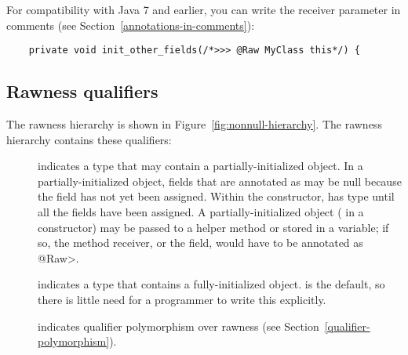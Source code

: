 For compatibility with Java 7 and earlier, you can write the receiver
parameter in comments (see Section~\ref{annotations-in-comments}):
\begin{Verbatim}
    private void init_other_fields(/*>>> @Raw MyClass this*/) {
\end{Verbatim}


\subsection{Rawness qualifiers\label{rawness-qualifiers}}

The rawness hierarchy is shown in Figure~\ref{fig:nonnull-hierarchy}.
The rawness hierarchy contains these qualifiers:

\begin{description}

\item[]
  indicates a type that may contain a partially-initialized object.  In a
  partially-initialized object, fields that are annotated as
   may be null because the field
  has not yet been assigned.  Within the constructor,
   has  type until all
  the  fields have been assigned.
  A partially-initialized object ( in a constructor) may be
  passed to a helper method or stored in a variable; if so, the method
  receiver, or the field, would have to be annotated as \<@Raw>.

\item[]
  indicates a type that contains a fully-initialized object.  
  is the default, so there is little need for a programmer to write this
  explicitly.

\item[]
  indicates qualifier polymorphism over rawness (see
  Section~\ref{qualifier-polymorphism}).

\end{description}


